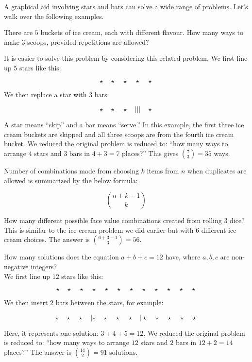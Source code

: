A graphical aid involving stars and bars can solve a wide range of problems. Let's walk over the following examples.

\begin{texample}
	There are $5$ buckets of ice cream, each with different flavour. How many ways to make $3$ scoops, provided repetitions are allowed?
	
	It is easier to solve this problem by considering this related problem. We first line up $5$ stars like this:
	
	$$\star\quad \star\quad \star\quad \star\quad \star$$
	
	We then replace a star with $3$ bars:
	
	$$\star\quad \star\quad \star\quad |||\quad \star$$
	
	A star means ``skip'' and a bar means ``serve.'' In this example, the first three ice cream buckets are skipped and all three scoops are from the fourth ice cream bucket. We reduced the original problem is reduced to: ``how many ways to arrange $4$ stars and $3$ bars in $4+3=7$ places?'' This gives $\binom{7}{3}=35$ ways.
\end{texample}

Number of combinations made from choosing $k$ items from $n$ when duplicates are allowed is summarized by the below formula:

$$\binom{n+k-1}{k}$$

\begin{texample}
	How many different possible face value combinations created from rolling $3$ dice? \\
	
	This is similar to the ice cream problem we did earlier but with $6$ different ice cream choices. The answer is ${6+3-1 \choose 3}=56$.
\end{texample}

\begin{texample}
	How many solutions does the equation $a+b+c=12$ have, where $a,b,c$ are non-negative integers? \\
	
	We first line up $12$ stars like this:
	
	$$\star\quad \star\quad \star\quad \star\quad \star\quad \star\quad \star\quad \star\quad \star\quad \star\quad \star\quad \star$$
	
	We then insert $2$ bars between the stars, for example:
	
	$$\star\quad \star\quad \star\quad |\star\quad \star\quad \star\quad \star\quad |\star\quad \star\quad \star\quad \star\quad \star$$
	
	Here, it represents one solution: $3+4+5=12$. We reduced the original problem is reduced to: ``how many ways to arrange $12$ stars and $2$ bars in $12+2=14$ places?'' The answer is $\binom{14}{2}=91$ solutions.
\end{texample}

